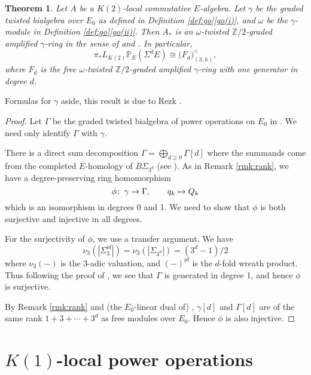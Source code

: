 \documentclass{gtpart}
\newtheorem{thm}{Theorem}
\theoremstyle{definition}
\theoremstyle{remark}
\def\co{\colon\thinspace}
\newcommand{\mb}[1]{\mathbb{#1}}
\newcommand{\BP}{{\mb P}}
\newcommand{\BZ}{{\mb Z}}
\newcommand{\G}{\Gamma}
\newcommand{\g}{\gamma}
\newcommand{\go}[1]{Definition \ref{def:go}\thinspace \eqref{go(#1)}}
\begin{document}
\begin{thm}
\label{thm:gamma}
 Let $A$ be a $K(2)$-local commutative $E$-algebra.  Let $\g$ be the 
 graded twisted bialgebra over $E_0$ as defined in \go{i}, and $\omega$ 
 be the $\g$-module in \go{ii}.  Then $A_*$ is an {\em $\omega$-twisted 
 $\BZ/2$-graded amplified $\g$-ring} in the sense of 
 \cite[Section 2]{cong} and \cite[2.5 and 2.6]{h2p2}.  In particular, 
 \[
  \pi_* L_{K(2)} \BP_E (\Sigma^d E) \cong \big( F_d \big)_{(3,h)}^\wedge, 
 \]
 where $F_d$ is the free $\omega$-twisted $\BZ/2$-graded amplified 
 $\g$-ring with one generator in degree $d$.  
\end{thm}
Formulas for $\g$ aside, this result is due to Rezk \cite{cong, h2p2}.  
\begin{proof}
 Let $\G$ be the graded twisted bialgebra of power operations on $E_0$ 
 in \cite[Section 6]{cong}.  We need only identify $\G$ with $\g$.  

 There is a direct sum decomposition $\G = \bigoplus_{d \geq 0} \G[d]$ 
 where the summands come from the completed $E$-homology of 
 $B\Sigma_{3^d}$ (see \cite[6.2]{cong}).  As in Remark \ref{rmk:rank}, 
 we have a degree-preserving ring homomorphism 
 \[
  \phi \co \g \to \G, \qquad q_k \mapsto Q_k 
 \]
 which is an isomorphism in degrees 0 and 1.  We need to show that 
 $\phi$ is both surjective and injective in all degrees.  

 For the surjectivity of $\phi$, we use a transfer argument.  We have 
 \[
  \nu_3(|\Sigma_3^{\wr d}|) = \nu_3(|\Sigma_{3^d}|) = (3^d - 1) / 2 
 \]
 where $\nu_3(-)$ is the 3-adic valuation, and $(-)^{\wr d}$ is the 
 $d$-fold wreath product.  Thus following the proof of 
 \cite[Proposition 3.17]{cong}, we see that $\G$ is generated in degree 
 1, and hence $\phi$ is surjective.  

 By Remark \ref{rmk:rank} and (the $E_0$-linear dual of) 
 \cite[Theorem 1.1]{Str98}, $\g[d]$ and $\G[d]$ are of the same rank 
 $1 + 3 + \cdots + 3^d$ as free modules over $E_0$.  Hence $\phi$ is 
 also injective.  
\end{proof}


\section{$K(1)$-local power operations}
\label{sec:K(1)}
\end{document}

